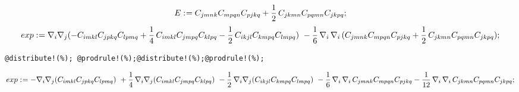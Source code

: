 \documentclass[11pt]{article}
\def\specialcolon{\mathrel{\mathop{:}}\hspace{-.5em}}
\begin{document}
\begin{dmath*}[compact, spread=2pt]
E\specialcolon{}= {C}_{j m n k} {C}_{m p q n} {C}_{p j k q} + \frac{1}{2}\, {C}_{j k m n} {C}_{p q m n} {C}_{j k p q};
\end{dmath*}
\begin{dmath*}[compact, spread=2pt]
exp\specialcolon{}= {\nabla}_{i}{{\nabla}_{j}{( - {C}_{i m k l} {C}_{j p k q} {C}_{l p m q} + \frac{1}{4}\, {C}_{i m k l} {C}_{j m p q} {C}_{k l p q} - \frac{1}{2}\, {C}_{i k j l} {C}_{k m p q} {C}_{l m p q})}\, }\,  - \frac{1}{6}\, {\nabla}_{i}\,  {\nabla}_{i}\,  ({C}_{j m n k} {C}_{m p q n} {C}_{p j k q} + \frac{1}{2}\, {C}_{j k m n} {C}_{p q m n} {C}_{j k p q});
\end{dmath*}
{\color[named]{Blue}\begin{verbatim}
@distribute!(%); @prodrule!(%);@distribute!(%);@prodrule!(%);
\end{verbatim}}
\begin{dmath*}[compact, spread=2pt]
exp\specialcolon{}=  - {\nabla}_{i}{{\nabla}_{j}{({C}_{i m k l} {C}_{j p k q} {C}_{l p m q})}\, }\,  + \frac{1}{4}\, {\nabla}_{i}{{\nabla}_{j}{({C}_{i m k l} {C}_{j m p q} {C}_{k l p q})}\, }\,  - \frac{1}{2}\, {\nabla}_{i}{{\nabla}_{j}{({C}_{i k j l} {C}_{k m p q} {C}_{l m p q})}\, }\,  - \frac{1}{6}\, {\nabla}_{i}\,  {\nabla}_{i}\,  {C}_{j m n k} {C}_{m p q n} {C}_{p j k q} - \frac{1}{12}\, {\nabla}_{i}\,  {\nabla}_{i}\,  {C}_{j k m n} {C}_{p q m n} {C}_{j k p q};
\end{dmath*}
\end{document}
